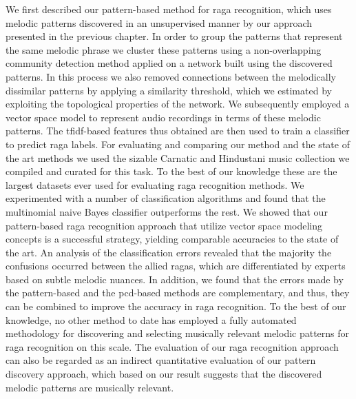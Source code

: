 We first described our pattern-based method for \gls{raga} recognition, which uses melodic patterns discovered in an unsupervised manner by our approach presented in the previous chapter. In order to group the patterns that represent the same melodic phrase we cluster these patterns using a non-overlapping community detection method applied on a network built using the discovered patterns. In this process we also removed connections between the melodically dissimilar patterns by applying a similarity threshold, which we estimated by exploiting the topological properties of the network. We subsequently employed a vector space model to represent audio recordings in terms of these melodic patterns. The \gls{tfidf}-based features thus obtained are then used to train a classifier to predict \gls{raga} labels. For evaluating and comparing our method and the state of the art methods we used the sizable Carnatic and Hindustani music collection we compiled and curated for this task. To the best of our knowledge these are the largest datasets ever used for evaluating \gls{raga} recognition methods. We experimented with a number of classification algorithms and found that the multinomial naive Bayes classifier outperforms the rest. We showed that our pattern-based \gls{raga} recognition approach that utilize vector space modeling concepts is a successful strategy, yielding comparable accuracies to the state of the art. An analysis of the classification errors revealed that the majority the confusions occurred between the allied \glspl{raga}, which are differentiated by experts based on subtle melodic nuances. In addition, we found that the errors made by the pattern-based and the \gls{pcd}-based methods are complementary, and thus, they can be combined to improve the accuracy in \gls{raga} recognition. To the best of our knowledge, no other method to date has employed a fully automated methodology for discovering and selecting musically relevant melodic patterns for \gls{raga} recognition on this scale. The evaluation of our \gls{raga} recognition approach can also be regarded as an indirect quantitative evaluation of our pattern discovery approach, which based on our result suggests that the discovered melodic patterns are musically relevant.


